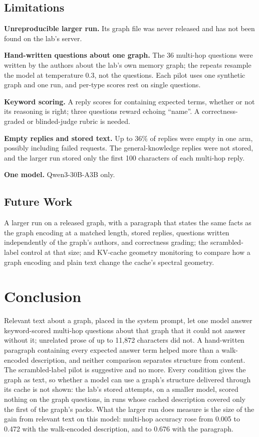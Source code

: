 \documentclass[11pt,a4paper]{article}
\begin{document}
\subsection{Limitations}

\textbf{Unreproducible larger run.} Its graph file was never released and has not been found on the lab's server.

\textbf{Hand-written questions about one graph.} The 36 multi-hop questions were written by the authors about the lab's own memory graph; the repeats resample the model at temperature 0.3, not the questions. Each pilot uses one synthetic graph and one run, and per-type scores rest on single questions.

\textbf{Keyword scoring.} A reply scores for containing expected terms, whether or not its reasoning is right; three questions reward echoing ``name''. A correctness-graded or blinded-judge rubric is needed.

\textbf{Empty replies and stored text.} Up to 36\% of replies were empty in one arm, possibly including failed requests. The general-knowledge replies were not stored, and the larger run stored only the first 100 characters of each multi-hop reply.

\textbf{One model.} Qwen3-30B-A3B only.

\subsection{Future Work}

A larger run on a released graph, with a paragraph that states the same facts as the graph encoding at a matched length, stored replies, questions written independently of the graph's authors, and correctness grading; the scrambled-label control at that size; and KV-cache geometry monitoring \citep{lyra2026spectral} to compare how a graph encoding and plain text change the cache's spectral geometry.

\section{Conclusion}

Relevant text about a graph, placed in the system prompt, let one model answer keyword-scored multi-hop questions about that graph that it could not answer without it; unrelated prose of up to 11,872 characters did not. A hand-written paragraph containing every expected answer term helped more than a walk-encoded description, and neither comparison separates structure from content. The scrambled-label pilot is suggestive and no more. Every condition gives the graph as text, so whether a model can use a graph's structure delivered through its cache is not shown: the lab's stored attempts, on a smaller model, scored nothing on the graph questions, in runs whose cached description covered only the first of the graph's packs. What the larger run does measure is the size of the gain from relevant text on this model: multi-hop accuracy rose from 0.005 to 0.472 with the walk-encoded description, and to 0.676 with the paragraph.
\end{document}
